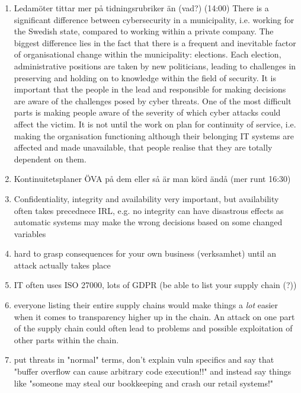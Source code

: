 \documentclass{article}
\begin{document}
\begin{enumerate}
    \item Ledamöter tittar mer på tidningsrubriker än (vad?) (14:00)
    There is a significant difference between cybersecurity in a municipality, i.e. working for the Swedish state, compared to working within a private company.
    The biggest difference lies in the fact that there is a frequent and inevitable factor of organisational change within the municipality: elections.
    Each election, administrative positions are taken by new politicians, leading to challenges in preserving and holding on to knowledge within the field of security.
    It is important that the people in the lead and responsible for making decisions are aware of the challenges posed by cyber threats.
    One of the most difficult parts is making people aware of the severity of which cyber attacks could affect the victim.
    It is not until the work on plan for continuity of service, i.e. making the organisation functioning although their belonging IT systems are affected and made unavailable, that people realise that they are totally dependent on them.
    \item Kontinuitetsplaner ÖVA på dem eller så är man körd ändå (mer runt 16:30)
    \item Confidentiality, integrity and availability very important, but availability often takes precednece IRL, e.g. no integrity can have disastrous effects as automatic systems may make the wrong decisions based on some changed variables
    \item hard to grasp consequences for your own business (verksamhet) until an attack actually takes place
    \item IT often uses ISO 27000, lots of GDPR (be able to list your supply chain (?))
    \item everyone listing their entire supply chains would make things a \textit{lot} easier when it comes to transparency higher up in the chain.
    An attack on one part of the supply chain could often lead to problems and possible exploitation of other parts within the chain.
    \item put threats in "normal" terms, don't explain vuln specifics and say that "buffer overflow can cause arbitrary code execution!!" and instead say things like "someone may steal our bookkeeping and crash our retail systems!"
\end{enumerate}
\end{document}
